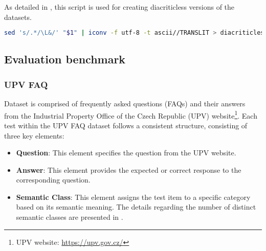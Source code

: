 As detailed in , this script is used for creating diacriticless versions of the datasets.

\begin{lstlisting}[language=bash,basicstyle=\small\ttfamily, frame=single, caption={Script for removing diacritics using Unix utilities}, captionpos=b, label={lst:diacriticless.sh},backgroundcolor=\color{light-gray}] 
  sed 's/.*/\L&/' "$1" | iconv -f utf-8 -t ascii//TRANSLIT > diacriticless/"$1"
\end{lstlisting}

\subsection{Evaluation  benchmark}

\subsubsection{UPV FAQ}

Dataset is comprised of frequently asked questions (FAQs) and their answers from the Industrial Property Office of the Czech Republic (UPV) website\footnote{\label{footnote_upv_website}UPV website: \url{https://upv.gov.cz/}}.
Each test within the UPV FAQ dataset follows a consistent structure, consisting of three key elements:
\begin{itemize}
  \item \textbf{Question}:
    This element specifies the question from the UPV website.
  \item \textbf{Answer}:
    This element provides the expected or correct response to the corresponding question.
  \item \textbf{Semantic Class}:
    This element assigns the test item to a specific category based on its semantic meaning.
    The details regarding the number of distinct semantic classes are presented in .
\end{itemize}




